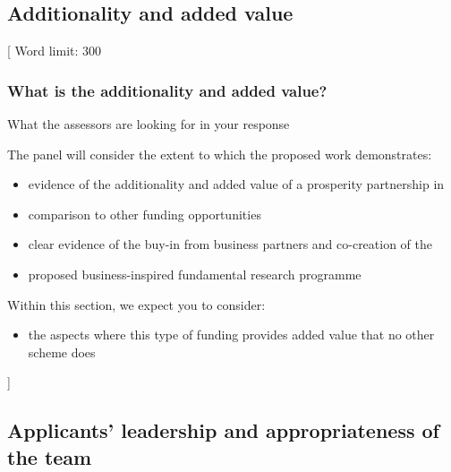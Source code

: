 \documentclass{article}
\newcommand{\desc}[1]{{\leavevmode\color{blue}[#1]}}
\begin{document}
% 

\subsection{Additionality and added value}

\desc{
Word limit: 300

\subsubsection*{What is the additionality and added value?}

What the assessors are looking for in your response

The panel will consider the extent to which the proposed work demonstrates:

\begin{itemize}

    \item evidence of the additionality and added value of a prosperity
        partnership in

    \item comparison to other funding opportunities

    \item clear evidence of the buy-in from business partners and co-creation
        of the

    \item proposed business-inspired fundamental research programme

\end{itemize}

Within this section, we expect you to consider:

\begin{itemize}

    \item the aspects where this type of funding provides added value that no
        other scheme does

\end{itemize}

}

% 

\subsection{Applicants’ leadership and appropriateness of the team}
\end{document}
